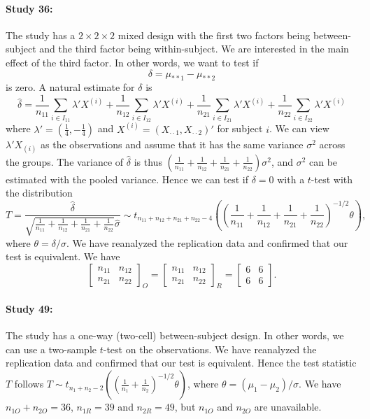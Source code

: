 \documentclass[11pt]{article}
\theoremstyle{definition}
\theoremstyle{custom}
\newcommand{\hdelta}{\hat{\delta}}
\newcommand{\hsigma}{\hat{\sigma}}
\begin{document}
  \paragraph{Study 36: \citet{Pacton:2008dj}}
  The study has a $2 \times 2 \times 2$ mixed design with the first two factors being between-subject and the third factor being within-subject. We are interested in the main effect of the third factor. In other words, we want to test if
  \[
  \delta = \mu_{**1} - \mu_{**2}
  \]
  is zero. A natural estimate for $\delta$ is
  \[
  \hdelta = \frac{1}{n_{11}} \sum_{i \in I_{11}} \lambda' X^{(i)} + \frac{1}{n_{12}} \sum_{i \in I_{12}} \lambda' X^{(i)} + \frac{1}{n_{21}} \sum_{i \in I_{21}} \lambda' X^{(i)} + \frac{1}{n_{22}} \sum_{i \in I_{22}} \lambda' X^{(i)}
  \]
  where $\lambda' = (\frac{1}{4}, -\frac{1}{4})$ and $X^{(i)} = (X_{\cdot \cdot 1}, X_{\cdot \cdot 2})'$ for subject $i$. We can view $\lambda' X_{(i)}$ as the observations and assume that it has the same variance $\sigma^2$ across the groups. The variance of $\hdelta$ is thus $(\frac{1}{n_{11}} + \frac{1}{n_{12}} + \frac{1}{n_{21}} + \frac{1}{n_{22}}) \sigma^2$, and $\sigma^2$ can be estimated with the pooled variance. Hence we can test if $\delta = 0$ with a $t$-test with the distribution
  \[
  T = \frac{\hdelta}{\sqrt{\frac{1}{n_{11}} + \frac{1}{n_{12}} + \frac{1}{n_{21}} + \frac{1}{n_{22}}} \hsigma} \sim t_{n_{11} + n_{12} + n_{21} + n_{22} - 4}\left(\left(\frac{1}{n_{11}} + \frac{1}{n_{12}} + \frac{1}{n_{21}} + \frac{1}{n_{22}}\right)^{-1/2} \theta\right),
  \]
  where $\theta = \delta / \sigma$. We have reanalyzed the replication data and confirmed that our test is equivalent. We have
  \[
  \begin{bmatrix}
  n_{11} & n_{12} \\
  n_{21} & n_{22}
  \end{bmatrix}_O = \begin{bmatrix}
  n_{11} & n_{12} \\
  n_{21} & n_{22}
  \end{bmatrix}_R = \begin{bmatrix}
  6 & 6 \\
  6 & 6
  \end{bmatrix}.
  \]

  \paragraph{Study 49: \citet{Albarracin:2008em}}
  The study has a one-way (two-cell) between-subject design. In other words, we can use a two-sample $t$-test on the observations. We have reanalyzed the replication data and confirmed that our test is equivalent. Hence the test statistic $T$ follows $T \sim t_{n_1 + n_2 - 2} \left(\left(\frac{1}{n_1} + \frac{1}{n_2}\right)^{-1/2} \theta\right)$, where $\theta = (\mu_1 - \mu_2) / \sigma$. We have $n_{1O} + n_{2O} = 36$, $n_{1R} = 39$ and $n_{2R} = 49$, but $n_{1O}$ and $n_{2O}$ are unavailable.
\end{document}
